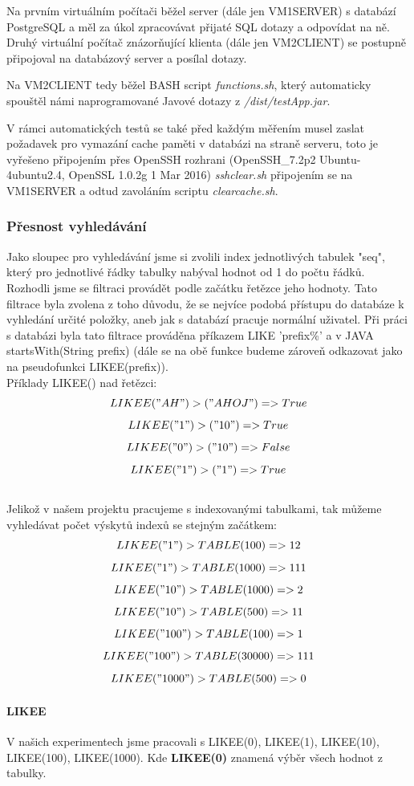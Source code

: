 \documentclass[a4paper, 11pt]{article}
\begin{document}
Na prvním virtuálním počítači běžel server (dále jen VM1SERVER) s databází PostgreSQL a měl za úkol zpracovávat přijaté SQL dotazy a odpovídat na ně.
Druhý virtuální počítač znázorňující klienta (dále jen VM2CLIENT) se postupně připojoval na databázový server a posílal dotazy. 

Na VM2CLIENT tedy běžel BASH \cite{bash_web} script \textit{functions.sh}, který automaticky spouštěl námi naprogramované Javové dotazy z \textit{/dist/testApp.jar}.

V rámci automatických testů se také před každým měřením musel zaslat požadavek pro vymazání cache paměti v databázi na straně serveru, toto je vyřešeno připojením přes OpenSSH rozhrani (OpenSSH\_7.2p2 Ubuntu-4ubuntu2.4, OpenSSL 1.0.2g  1 Mar 2016) \cite{openssh} \textit{sshclear.sh} připojením se na VM1SERVER a odtud zavoláním scriptu \textit{clearcache.sh}.

\subsubsection{Přesnost vyhledávání}

Jako sloupec pro vyhledávání jsme si zvolili index jednotlivých tabulek "seq", který pro jednotlivé řádky tabulky nabýval hodnot od 1 do počtu řádků. Rozhodli jsme se filtraci provádět podle začátku řetězce jeho hodnoty. Tato filtrace byla zvolena z toho důvodu, že se nejvíce podobá přístupu do databáze k vyhledání určité položky, aneb jak s databází pracuje normální uživatel. Při práci s databázi byla tato filtrace prováděna příkazem LIKE 'prefix\%' \cite{sqllike} a v JAVA startsWith(String prefix) \cite{javalike} (dále se na obě funkce budeme zároveň odkazovat jako na pseudofunkci LIKEE(prefix)).
\\
Příklady LIKEE() nad řetězci:
$$LIKEE("AH") > ("AHOJ") => True$$
$$LIKEE("1") > ("10") => True$$
$$LIKEE("0") > ("10") => False$$
$$LIKEE("1") > ("1") => True$$
\\
Jelikož v našem projektu pracujeme s indexovanými tabulkami, tak můžeme vyhledávat počet výskytů indexů se stejným začátkem:
$$LIKEE("1") > TABLE(100) => 12$$
$$LIKEE("1") > TABLE(1000) => 111$$
$$LIKEE("10") > TABLE(1000) => 2$$
$$LIKEE("10") > TABLE(500)=> 11$$
$$LIKEE("100") > TABLE(100)=> 1$$
$$LIKEE("100") > TABLE(30000) => 111$$
$$LIKEE("1000") > TABLE(500) => 0$$

\paragraph{LIKEE} \label{sec:likee}
V našich experimentech jsme pracovali s LIKEE(0), LIKEE(1), LIKEE(10), LIKEE(100), LIKEE(1000). Kde \textbf{LIKEE(0)} znamená výběr všech hodnot z tabulky.
\end{document}
